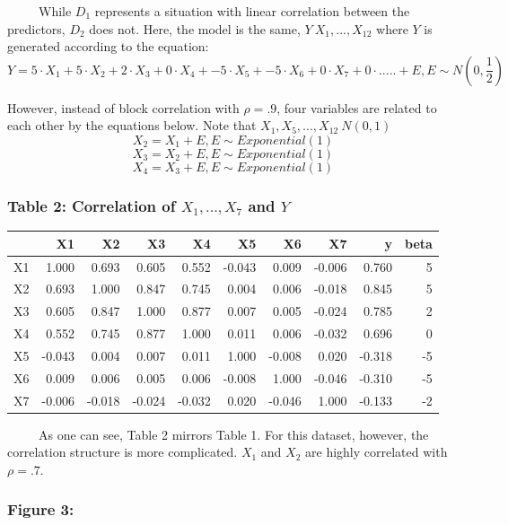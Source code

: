 \documentclass[12pt,twoside]{reedthesis}
\begin{document}
  ~~~~~While \(D_1\) represents a situation with linear correlation
  between the predictors, \(D_2\) does not. Here, the model is the same,
  \(Y~X_1,...,X_12\) where \(Y\) is generated according to the equation:
  \[Y = 5 \cdot X_1 + 5 \cdot X_2 + 2 \cdot X_3 + 0 \cdot X_4 + -5 \cdot X_5 + -5\cdot X_6 + 0\cdot X_7 + 0 \cdot ..... + E, E \sim N(0,\frac 1 2 )\]
  
  However, instead of block correlation with \(\rho = .9\), four variables
  are related to each other by the equations below. Note that
  \(X_1, X_5,...,X_{12} ~ N(0,1)\)
  \[X_2 = X_1 + E, E \sim Exponential(1)\]
  \[X_3 = X_2 + E, E \sim Exponential(1)\]
  \[X_4 = X_3 + E, E \sim Exponential(1)\]
  
  \subsubsection{\texorpdfstring{Table 2: Correlation of \(X_1,..., X_7\)
  and
  \(Y\)}{Table 2: Correlation of X\_1,..., X\_7 and Y}}\label{table-2-correlation-of-x_1...-x_7-and-y}
  
  \begin{longtable}[]{@{}lrrrrrrrrr@{}}
  \toprule
  & X1 & X2 & X3 & X4 & X5 & X6 & X7 & y & beta\tabularnewline
  \midrule
  \endhead
  X1 & 1.000 & 0.693 & 0.605 & 0.552 & -0.043 & 0.009 & -0.006 & 0.760 &
  5\tabularnewline
  X2 & 0.693 & 1.000 & 0.847 & 0.745 & 0.004 & 0.006 & -0.018 & 0.845 &
  5\tabularnewline
  X3 & 0.605 & 0.847 & 1.000 & 0.877 & 0.007 & 0.005 & -0.024 & 0.785 &
  2\tabularnewline
  X4 & 0.552 & 0.745 & 0.877 & 1.000 & 0.011 & 0.006 & -0.032 & 0.696 &
  0\tabularnewline
  X5 & -0.043 & 0.004 & 0.007 & 0.011 & 1.000 & -0.008 & 0.020 & -0.318 &
  -5\tabularnewline
  X6 & 0.009 & 0.006 & 0.005 & 0.006 & -0.008 & 1.000 & -0.046 & -0.310 &
  -5\tabularnewline
  X7 & -0.006 & -0.018 & -0.024 & -0.032 & 0.020 & -0.046 & 1.000 & -0.133
  & -2\tabularnewline
  \bottomrule
  \end{longtable}
  
  ~~~~~As one can see, Table 2 mirrors Table 1. For this dataset, however,
  the correlation structure is more complicated. \(X_1\) and \(X_2\) are
  highly correlated with \(\rho = .7\).
  
  \subsubsection{Figure 3:}\label{figure-3}
  
\end{document}
